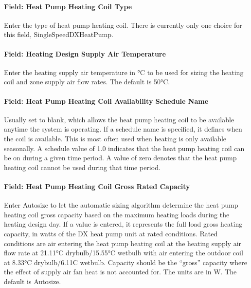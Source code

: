 \paragraph{Field: Heat Pump Heating Coil Type}\label{field-heat-pump-heating-coil-type-3}

Enter the type of heat pump heating coil. There is currently only one choice for this field, SingleSpeedDXHeatPump.

\paragraph{Field: Heating Design Supply Air Temperature}\label{field-heating-design-supply-air-temperature-1}

Enter the heating supply air temperature in °C to be used for sizing the heating coil and zone supply air flow rates. The default is 50°C.

\paragraph{Field: Heat Pump Heating Coil Availability Schedule Name}\label{field-heat-pump-heating-coil-availability-schedule-name-2}

Usually set to blank, which allows the heat pump heating coil to be available anytime the system is operating. If a schedule name is specified, it defines when the coil is available. This is most often used when heating is only available seasonally. A schedule value of 1.0 indicates that the heat pump heating coil can be on during a given time period. A value of zero denotes that the heat pump heating coil cannot be used during that time period.

\paragraph{Field: Heat Pump Heating Coil Gross Rated Capacity}\label{field-heat-pump-heating-coil-gross-rated-capacity-3}

Enter Autosize to let the automatic sizing algorithm determine the heat pump heating coil gross capacity based on the maximum heating loads during the heating design day. If a value is entered, it represents the full load gross heating capacity, in watts of the DX heat pump unit at rated conditions. Rated conditions are air entering the heat pump heating coil at the heating supply air flow rate at 21.11°C drybulb/15.55°C wetbulb with air entering the outdoor coil at 8.33°C drybulb/6.11C wetbulb. Capacity should be the ``gross'' capacity where the effect of supply air fan heat is not accounted for. The units are in W. The default is Autosize.

